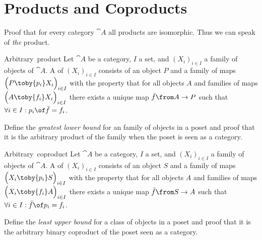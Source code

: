 \def\pathToRoot{../../}



\author{Maximilian Wuttke}


\section{Products and Coproducts}

\begin{exercise}
  Proof that for every category $\cat{A}$ all products are isomorphic. Thus we can speak of \emph{the} product.
\end{exercise}

\begin{definition}{Arbitrary\ product}
  Let $\cat{A}$ be a category, $I$ a set, and $(X_i)_{i \in I}$ a family of objects of $\cat{A}$.
  A  of $(X_i)_{i \in I}$ consists of an object $P$ and a family of maps
  $\Bigl(P \toby{p_i} X_i\Bigr)_{i \in I}$
  with the property that for all objects $A$ and families of maps
  $\Bigl(A \toby{f_i} X_i\Bigr)_{i \in I}$
  there exists a unique map $\bar{f}\from A \to P$ such that
  $\forall i \in I: p_i \of \bar{f} = f_i$.
\end{definition}

\begin{exercise}
  Define the \emph{greatest lower bound} for an family of objects in a poset and proof that it is the arbitrary product of the family when the poset is seen as a category.
\end{exercise}

\begin{definition}{Arbitrary\ coproduct}
  Let $\cat{A}$ be a category, $I$ a set, and $(X_i)_{i \in I}$ a family of objects of $\cat{A}$.
  A  of $(X_i)_{i \in I}$ consists of an object $S$ and a family of maps
  $\Bigl(X_i \toby{p_i} S\Bigr)_{i \in I}$
  with the property that for all objects $A$ and families of maps
  $\Bigl(X_i \toby{f_i} A\Bigr)_{i \in I}$
  there exists a unique map $\bar{f}\from S \to A$ such that
  $\forall i \in I: \bar{f} \of p_i = f_i$.
\end{definition}

\begin{exercise}
  Define the \emph{least upper bound} for a class of objects in a poset and proof that it is the arbitrary binary coproduct of the poset seen as a category.
\end{exercise}


